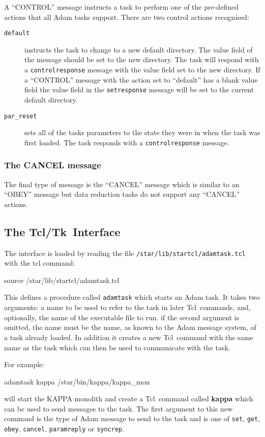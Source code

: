 \documentclass[twoside,11pt,nolof]{starlink}
\providecommand{\Tcl}{{\textsf{Tcl}}}
\providecommand{\TclTk}{{\textsf{Tcl/Tk}}}
\begin{document}
A ``CONTROL'' message instructs a task to perform one of the pre-defined
actions that all Adam tasks support. There are two control actions recognised:
\begin{description}
\item[\texttt{default}] instructs the task to
change to a new default directory. The value field of the message should
be set to the new directory. The task will respond with a \texttt{controlresponse} message with the value field set to the new directory.
If a ``CONTROL'' message with the action set to ``default'' has a blank value
field the value field in the \texttt{setresponse} message will be set to the
current default directory.
\item[\texttt{par\_reset}] sets all of the tasks parameters to the
state they were in when the task was first loaded. The task responds with
a \texttt{controlresponse} message.
\end{description}

\subsubsection{The CANCEL message}
The final type of message is the ``CANCEL'' message which is similar to an
``OBEY'' message but data reduction tasks do not support any ``CANCEL''
actions.

\subsection{\label{tcltk_interface}The \TclTk\ Interface}

The interface is loaded by reading the file
{\tt{/star/lib/startcl/adamtask.tcl}} with the tcl command:

\begin{terminalv}
source /star/lib/startcl/adamtask.tcl
\end{terminalv}

This defines a procedure called \texttt{adamtask} which starts an Adam
task. It takes two arguments: a name to be used to refer to the task in later
\Tcl\ commands, and, optionally, the name of the executable file to run.
if the second argument is omitted, the name must be the name, as known to the
Adam message system, of a task already loaded.
In addition it
creates a new \Tcl\ command with the same name as the task which can then be
used to communicate with the task.

For example:
\begin{terminalv}
adamtask kappa /star/bin/kappa/kappa_mon
\end{terminalv}
will start the KAPPA monolith and create a \Tcl\ command called \textbf{kappa}
which can be used to send messages to the task.
The first argument to this new command is the type of Adam message to
send to the task and is one of \texttt{set}, \texttt{get}, \texttt{obey}, \texttt{cancel}, \texttt{paramreply} or \texttt{syncrep}.
\end{document}
